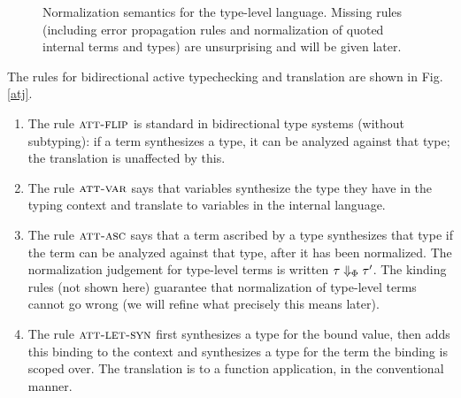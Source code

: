 \documentclass[10pt,preprint]{sigplanconf}
\begin{document}
{\begin{figure}[t]
\begin{mathpar}
\end{mathpar}
\caption{\small Normalization semantics for the type-level language. Missing rules (including error propagation rules and normalization of quoted internal terms and types) are unsurprising and will be given later.}
\label{tleval}
\end{figure}
The rules for bidirectional active typechecking and translation are shown in Fig. \ref{atj}. 

\begin{enumerate}
\item The rule $\textsc{att-flip}$ is standard in bidirectional type systems (without subtyping): if a term synthesizes a type, it can be analyzed against that type; the translation is unaffected by this.
\item The rule $\textsc{att-var}$ says that variables synthesize the type they have in the typing context and translate to variables in the internal language.
\item The rule $\textsc{att-asc}$ says that a term ascribed by a type synthesizes that type if the term can be  analyzed against that type, after it has been normalized. The normalization judgement for type-level terms is written $\tau \Downarrow_\fvalCtx \tau'$. The kinding rules (not shown here) guarantee that normalization of type-level terms cannot go wrong (we will refine what precisely this means later).
\item The rule $\textsc{att-let-syn}$ first synthesizes a type for the bound value, then adds this binding to the context and synthesizes a type for the term the binding is scoped over. The translation is to a function application, in the conventional manner. 


\end{enumerate}}
\end{document}
